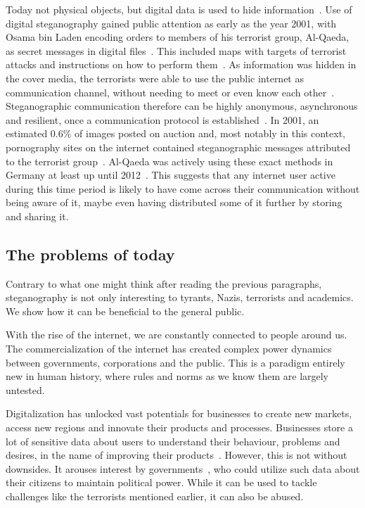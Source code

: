 Today not physical objects, but digital data is used to hide information~\cite{bennettLinguisticSteganographySurvey2004}. Use of digital steganography gained public attention as early as the year 2001, with Osama bin Laden encoding orders to members of his terrorist group, Al-Qaeda, as secret messages in digital files~\cite{dembartEndUserHide2001,schneierTerroristsSteganography2001}. This included maps with targets of terrorist attacks and instructions on how to perform them~\cite{schneierTerroristsSteganography2001}. As information was hidden in the cover media, the terrorists were able to use the public internet as communication channel, without needing to meet or even know each other~\cite{schneierTerroristsSteganography2001}. Steganographic communication therefore can be highly anonymous, asynchronous and resilient, once a communication protocol is established~\cite{schneierTerroristsSteganography2001}. In 2001, an estimated 0.6\% of images posted on auction and, most notably in this context, pornography sites on the internet contained steganographic messages attributed to the terrorist group~\cite{kolataVeiledMessagesTerror2001}. Al-Qaeda was actively using these exact methods in Germany at least up until 2012~\cite{robertsonDocumentsRevealQaedas2012}. This suggests that any internet user active during this time period is likely to have come across their communication without being aware of it, maybe even having distributed some of it further by storing and sharing it.

\subsection{The problems of today}
\label{sec:theProblemsOfToday}
Contrary to what one might think after reading the previous paragraphs, steganography is not only interesting to tyrants, Nazis, terrorists and academics. We show how it can be beneficial to the general public.

With the rise of the internet, we are constantly connected to people around us. The commercialization of the internet has created complex power dynamics between governments, corporations and the public. This is a paradigm entirely new in human history, where rules and norms as we know them are largely untested.

Digitalization has unlocked vast potentials for businesses to create new markets, access new regions and innovate their products and processes. Businesses store a lot of sensitive data about users to understand their behaviour, problems and desires, in the name of improving their products~\cite{duportailAskedTinderMy2017,titcombMillionsPeoplesDNA2025}. However, this is not without downsides. It arouses interest by governments~\cite{greenwaldNSAPrismProgram2013}, who could utilize such data about their citizens to maintain political power. While it can be used to tackle challenges like the terrorists mentioned earlier, it can also be abused.

